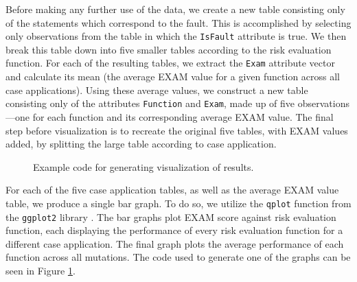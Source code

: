 Before making any further use of the data, we create a new table consisting only of the statements
which correspond to the fault.  This is accomplished by selecting only observations from the table
in which the \texttt{IsFault} attribute is true.  We then break this table down into five smaller tables according to the risk evaluation function.  For each of the resulting tables, we extract the 
\texttt{Exam} attribute vector and calculate its mean (the average EXAM value for a given function
across all case applications).  Using these average values, we construct a new table consisting only
of the attributes \texttt{Function} and \texttt{Exam}, made up of five observations---one for each
function and its corresponding average EXAM value.  The final step before visualization is to 
recreate the original five tables, with EXAM values added, by splitting the large table according to
case application.

\begin{figure}[tb]
\centering

\caption{Example code for generating visualization of results.}
\label{fig:rgraph}
\end{figure}

For each of the five case application tables, as well as the average EXAM value table, we produce a
single bar graph.  To do so, we utilize the \texttt{qplot} function from the \texttt{ggplot2} library
\cite{ggplot2}.  The bar graphs plot EXAM score against risk evaluation function, each displaying the
performance of every risk evaluation function for a different case application.  The final graph plots
the average performance of each function across all mutations.  The code used to generate one of the
graphs can be seen in Figure \ref{fig:rgraph}.

